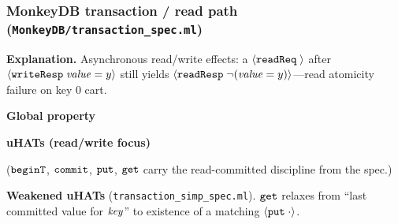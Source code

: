\subsubsection*{MonkeyDB transaction / read path (\texttt{MonkeyDB/transaction\_spec.ml})}
\textbf{Explanation.}
Asynchronous read/write effects: a \({\langle} {\boldsymbol{{\tt readReq}}\;{}} {\rangle}\) after \({\langle} {\boldsymbol{{\tt writeResp}}\;{\mathit{value}=y}} {\rangle}\) still yields \({\langle} {\boldsymbol{{\tt readResp}}\;{\neg(\mathit{value}=y)}} {\rangle}\)---read atomicity failure on key \(0\) cart.

\textbf{Global property}
\vspace{-.35cm}\par{}
\vspace{-.4cm}\par\nobreak\noindent
\textbf{uHATs (read/write focus)}
\vspace{-.35cm}\par{}
\vspace{-.4cm}\par\nobreak\noindent
(\(\boldsymbol{{\tt beginT}}\), \(\boldsymbol{{\tt commit}}\), \(\boldsymbol{{\tt put}}\), \(\boldsymbol{{\tt get}}\) carry the read-committed discipline from the spec.)

\textbf{Weakened uHATs} (\texttt{transaction\_simp\_spec.ml}).
\(\boldsymbol{{\tt get}}\) relaxes from ``last committed value for \(\mathit{key}\)'' to existence of a matching \({\langle} {\boldsymbol{{\tt put}}\;{\cdot}} {\rangle}\).

